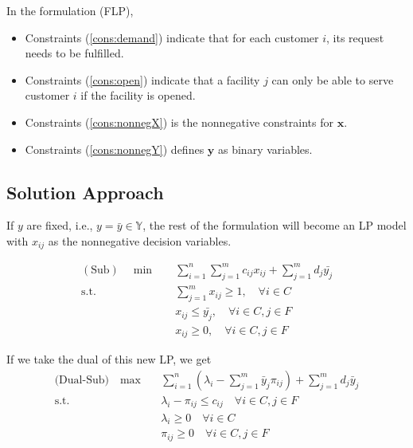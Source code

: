             In the formulation (FLP), 
            \begin{itemize}
                \item Constraints (\ref{cons:demand}) indicate that for each customer $i$, its request needs to be fulfilled.
                \item Constraints (\ref{cons:open}) indicate that a facility $j$ can only be able to serve customer $i$ if the facility is opened.
                \item Constraints (\ref{cons:nonnegX}) is the nonnegative constraints for $\mathbf{x}$.
                \item Constraints (\ref{cons:nonnegY}) defines $\mathbf{y}$ as binary variables.
            \end{itemize}

        \subsection{Solution Approach}
            If $y$ are fixed, i.e., $y = \bar{y} \in \mathbb{Y}$, the rest of the formulation will become an LP model with $x_{ij}$ as the nonnegative decision variables. 

            \begin{align*}
                (\text{Sub}) \quad \min \quad & \sum_{i = 1}^n \sum_{j = 1}^m c_{ij} x_{ij} + \sum_{j = 1}^m d_j \bar{y_j}\\
                \text{s.t.} \quad &\sum_{j = 1}^m x_{ij} \ge 1, \quad \forall i \in C\\
                    &x_{ij} \le \bar{y_j}, \quad \forall i \in C, j \in F\\
                    &x_{ij} \ge 0, \quad \forall i \in C, j \in F
            \end{align*}

            If we take the dual of this new LP, we get
            \begin{align*}
                \text{(Dual-Sub)} \quad \max \quad & \sum_{i = 1}^n (\lambda_i - \sum_{j = 1}^m \bar{y}_j \pi_{ij}) + \sum_{j = 1}^m d_j \bar{y}_j \\
                \text{s.t.} \quad & \lambda_i - \pi_{ij} \le c_{ij} \quad \forall i \in C, j \in F\\
                & \lambda_i \ge 0\quad \forall i \in C\\
                & \pi_{ij} \ge 0 \quad \forall i \in C, j \in F
            \end{align*}

